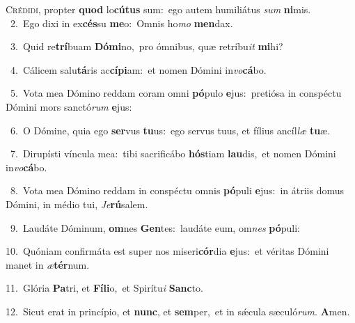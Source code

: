 \lettrine{\initial\textcolor{\initialcolor}{C}}{rédidi,} propter \textbf{quod} lo\-\textbf{cú}\-\textbf{tus} sum:~\star ego autem humiliátus \textit{sum} \textbf{ni}\-mis.\\
{\numbfont\textcolor{\numbcolor}{~2.}}~Ego dixi in ex\-\textbf{cés}\-su \textbf{me}\-o:~\star Omnis ho\textit{mo} \textbf{men}\-dax.\par
{\numbfont\textcolor{\numbcolor}{~3.}}~Quid re\-\textbf{trí}\-buam \textbf{Dó}\-\textbf{mi}no,~\star pro ómnibus, quæ retríbu\textit{it} \textbf{mi}\-hi?\par
{\numbfont\textcolor{\numbcolor}{~4.}}~Cálicem salu\-\textbf{tá}\-ris ac\-\textbf{cí}\-\textbf{pi}am:~\star et nomen Dómini in\-\textit{vo}\-\textbf{cá}bo.\par
{\numbfont\textcolor{\numbcolor}{~5.}}~Vota mea Dómino reddam coram omni \textbf{pó}\-pulo \textbf{e}\-jus:~\star pretiósa in conspéctu Dómini mors sanctó\textit{rum} \textbf{e}\-jus:\par
{\numbfont\textcolor{\numbcolor}{~6.}}~O Dómine, quia ego \textbf{ser}\-vus \textbf{tu}\-us:~\star ego servus tuus, et fílius ancíl\textit{læ} \textbf{tu}\-æ.\par
{\numbfont\textcolor{\numbcolor}{~7.}}~Dirupísti víncula mea:~\dagger tibi sacrificábo \textbf{hós}\-tiam \textbf{lau}\-dis,~\star et nomen Dómini in\-\textit{vo}\-\textbf{cá}bo.\par
{\numbfont\textcolor{\numbcolor}{~8.}}~Vota mea Dómino reddam in conspéctu omnis \textbf{pó}\-puli \textbf{e}\-jus:~\star in átriis domus Dómini, in médio tui, \textit{Je}\-\textbf{rú}salem.\par
{\numbfont\textcolor{\numbcolor}{~9.}}~Laudáte Dóminum, \textbf{om}\-nes \textbf{Gen}\-tes:~\star laudáte eum, om\textit{nes} \textbf{pó}\-puli:\par
{\numbfont\textcolor{\numbcolor}{10.}}~Quóniam confirmáta est super nos miseri\-\textbf{cór}\-dia \textbf{e}\-jus:~\star et véritas Dómini manet in \textit{æ}\-\textbf{tér}num.\par
{\numbfont\textcolor{\numbcolor}{11.}}~Glória \textbf{Pa}\-tri, et \textbf{Fí}\-\textbf{li}o,~\star et Spirítu\textit{i} \textbf{Sanc}\-to.\par
{\numbfont\textcolor{\numbcolor}{12.}}~Sicut erat in princípio, et \textbf{nunc}\-, et \textbf{sem}\-per,~\star et in sǽcula sæculó\-\textit{rum}\-. \textbf{A}\-men.\par
